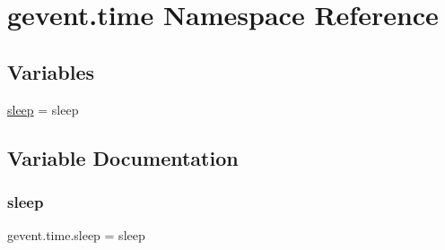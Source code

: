 \hypertarget{namespacegevent_1_1time}{}\section{gevent.\+time Namespace Reference}
\label{namespacegevent_1_1time}
\subsection*{Variables}
\begin{DoxyCompactItemize}
\item 
\hyperlink{namespacegevent_1_1time_a33a5ad9c58700806f043b4500329cc2d}{sleep} = sleep
\end{DoxyCompactItemize}


\subsection{Variable Documentation}
\mbox{\label{namespacegevent_1_1time_a33a5ad9c58700806f043b4500329cc2d}} 
\subsubsection{\texorpdfstring{sleep}{sleep}}
{\footnotesize\ttfamily gevent.\+time.\+sleep = sleep}

